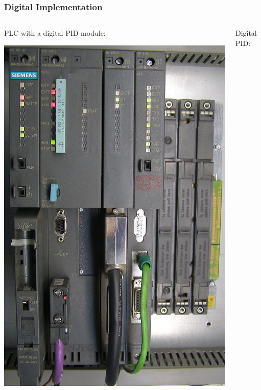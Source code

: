 \begin{frame}
	\frametitle{Digital Implementation}
	\begin{columns}
		\begin{column}{0.5\linewidth}
			\centering PLC with a digital PID module:
			
			\vspace{1em}
			\includegraphics[height=0.7\textheight]{img/640px-Siemens_Simatic_S7-416-3}
		\end{column}
		\begin{column}{0.5\linewidth}
			\centering Digital PID:
			\vspace{1em}
			\begin{columns}
				\begin{column}{0.4\linewidth}

\end{column}
\end{columns}
\end{column}
\end{columns}
\end{frame}

